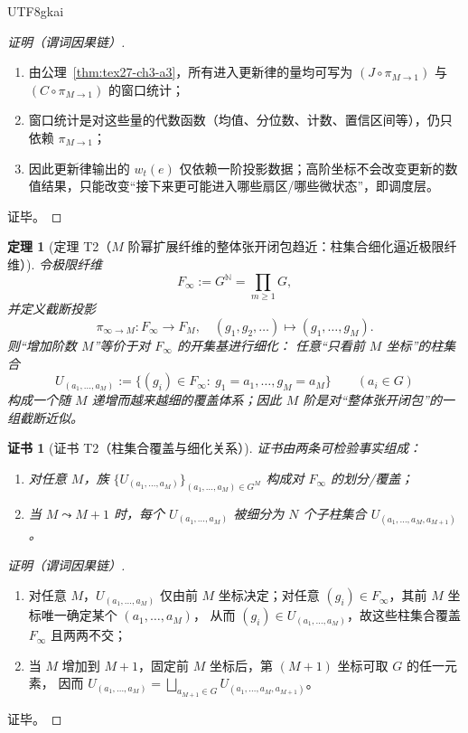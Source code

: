 \documentclass[12pt]{article}
\newtheorem{theorem}{定理}[section]
\newtheorem{Certificate}{证书}[section]
\newcommand{\NN}{\mathbb{N}}
\begin{document}
\begin{CJK*}{UTF8}{gkai}
\begin{proof}[证明（谓词因果链）]
\begin{enumerate}
  \item 由公理~\ref{thm:tex27-ch3-a3}，所有进入更新律的量均可写为 $(J\circ\pi_{M\to 1})$ 与 $(C\circ\pi_{M\to 1})$ 的窗口统计；
  \item 窗口统计是对这些量的代数函数（均值、分位数、计数、置信区间等），仍只依赖 $\pi_{M\to 1}$；
  \item 因此更新律输出的 $w_t(e)$ 仅依赖一阶投影数据；高阶坐标不会改变更新的数值结果，只能改变“接下来更可能进入哪些扇区/哪些微状态”，即调度层。
\end{enumerate}
证毕。
\end{proof}

\begin{theorem}[定理 T2（$M$ 阶幂扩展纤维的整体张开闭包趋近：柱集合细化逼近极限纤维）]
\label{thm:tex27-ch3-t2}
令极限纤维
\[
  F_\infty := G^{\NN}=\prod_{m\ge 1}G,
\]
并定义截断投影
\[
  \pi_{\infty\to M}:F_\infty\to F_M,\quad (g_1,g_2,\dots)\mapsto (g_1,\dots,g_M).
\]
则“增加阶数 $M$”等价于对 $F_\infty$ 的开集基进行细化：
任意“只看前 $M$ 坐标”的柱集合
\[
  U_{(a_1,\dots,a_M)}
  :=\{(g_i)\in F_\infty:\ g_1=a_1,\dots,g_M=a_M\}
  \qquad (a_i\in G)
\]
构成一个随 $M$ 递增而越来越细的覆盖体系；因此 $M$ 阶是对“整体张开闭包”的一组截断近似。
\end{theorem}

\begin{Certificate}[证书 T2（柱集合覆盖与细化关系）]
\label{cert:tex27-ch3-t2}
证书由两条可检验事实组成：
\begin{enumerate}
  \item 对任意 $M$，族 $\{U_{(a_1,\dots,a_M)}\}_{(a_1,\dots,a_M)\in G^M}$ 构成对 $F_\infty$ 的划分/覆盖；
  \item 当 $M\leadsto M+1$ 时，每个 $U_{(a_1,\dots,a_M)}$ 被细分为 $N$ 个子柱集合
  $U_{(a_1,\dots,a_M,a_{M+1})}$。
\end{enumerate}
\end{Certificate}

\begin{proof}[证明（谓词因果链）]
\begin{enumerate}
  \item 对任意 $M$，$U_{(a_1,\dots,a_M)}$ 仅由前 $M$ 坐标决定；对任意 $(g_i)\in F_\infty$，其前 $M$ 坐标唯一确定某个 $(a_1,\dots,a_M)$，
  从而 $(g_i)\in U_{(a_1,\dots,a_M)}$，故这些柱集合覆盖 $F_\infty$ 且两两不交；
  \item 当 $M$ 增加到 $M+1$，固定前 $M$ 坐标后，第 $(M+1)$ 坐标可取 $G$ 的任一元素，
  因而 $U_{(a_1,\dots,a_M)}=\bigsqcup_{a_{M+1}\in G}U_{(a_1,\dots,a_M,a_{M+1})}$。
\end{enumerate}
证毕。
\end{proof}


\end{CJK*}
\end{document}
